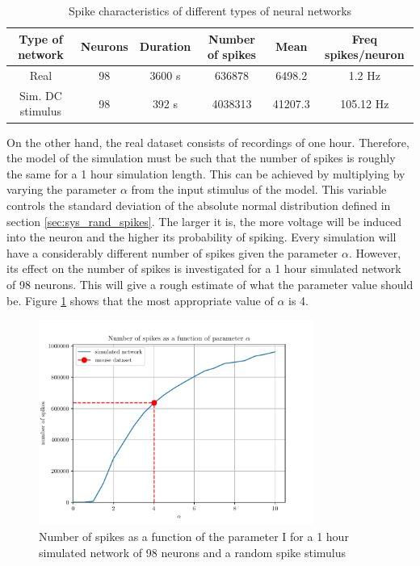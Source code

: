 \begin{table}[]
\centering
\begin{tabular}{|c|c|c|c|c|c|}
\hline
Type of network  & Neurons & Duration & Number of spikes & Mean    & Freq spikes/neuron \\ \hline
Real             & 98                & 3600 s           & 636878           & 6498.2  & 1.2 Hz               \\ \hline
Sim. DC stimulus & 98                & 392 s            & 4038313          & 41207.3 & 105.12 Hz            \\ \hline
\end{tabular}
\caption{Spike characteristics of different types of neural networks}
\label{tab:spike_characteristics}
\end{table}

On the other hand, the real dataset consists of recordings of one hour. Therefore, the model of the simulation must be such that the number of spikes is roughly the same for a 1 hour simulation length. This can be achieved by multiplying by varying the parameter \(\alpha\) from the input stimulus of the model. This variable controls the standard deviation of the absolute normal distribution defined in section \ref{sec:sys_rand_spikes}. The larger it is, the more voltage will be induced into the neuron and the higher its probability of spiking.
Every simulation will have a considerably different number of spikes given the parameter \(\alpha\). However, its effect on the number of spikes is investigated for a 1 hour simulated network of 98 neurons. This will give a rough estimate of what the parameter value should be. Figure \ref{fig:I_var_plot} shows that the most appropriate value of \(\alpha\) is 4. 

\begin{figure}[H]
	\centering
	\includegraphics[width=0.8\textwidth]{I_var_plot.pdf}
	\caption{Number of spikes as a function of the parameter I for a 1 hour simulated network of 98 neurons and a random spike stimulus}
	\label{fig:I_var_plot}
\end{figure}



